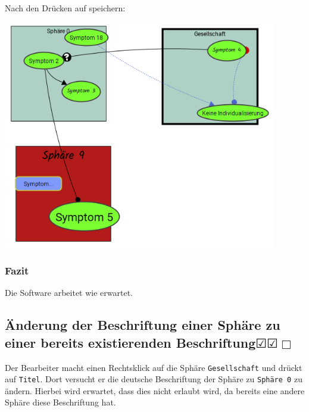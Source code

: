 \documentclass[enabledeprecatedfontcommands]{scrartcl}
\newcommand{\subsectiont}[2]{\subsection[#1]{#1{\normalsize\normalfont #2}}}
\newcommand{\leer}{$\Box$}
\newcommand{\ok}{$\CheckedBox$}
\begin{document}
Nach den Drücken auf speichern:
\begin{center}
\includegraphics[height=10cm]{3_49speichern.PNG}
\end{center}
\subsubsection{Fazit}
Die Software arbeitet wie erwartet.

\subsectiont{Änderung der Beschriftung einer Sphäre zu einer bereits existierenden Beschriftung}{\dotfill\ok\ok\leer}
Der Bearbeiter macht einen Rechtsklick auf die Sphäre \texttt{Gesellschaft} und drückt auf \texttt{Titel}. Dort versucht er die deutsche Beschriftung der Sphäre zu \texttt{Sphäre 0} zu ändern. Hierbei wird erwartet, dass dies nicht erlaubt wird, da bereits eine andere Sphäre diese Beschriftung hat. 
\end{document}
